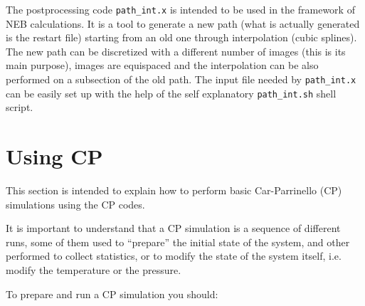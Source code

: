 \documentclass[12pt,a4paper]{article}
\begin{document}
The postprocessing code \texttt{path\_int.x} is intended to be used in
the framework of NEB calculations.
It is a tool to generate a new path (what is actually generated is the
restart file) starting from an old one through interpolation (cubic
splines).
The new path can be discretized with a different number of images
(this is its main purpose), images are equispaced and the
interpolation can be also performed on a subsection of the old path.
The input file needed by \texttt{path\_int.x} can be easily set up
with the help of the self explanatory \texttt{path\_int.sh} shell
script.

\clearpage

\section{Using CP}

This section is intended to explain how to perform basic
Car-Parrinello (CP) simulations using the CP codes.

It is important to understand that a CP simulation is a sequence of 
different runs, some of them used to ``prepare'' the initial state
of the system, and other performed to collect statistics,
or to modify the state of the system itself, i.e. modify the temperature
or the pressure.

To prepare and run a CP simulation you should:
\end{document}
